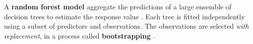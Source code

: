 \documentclass{article}
\begin{document}

	
	A \textbf{random forest model} aggregate the predictions of a large ensemble of decision trees to estimate the response value \cite{breiman2001random}. Each tree is fitted independently using a subset of predictors and observations. The observations are selected \textit{with replacement}, in a process called \textbf{bootstrapping} \cite{efron1994introduction}.
	
\end{document}
